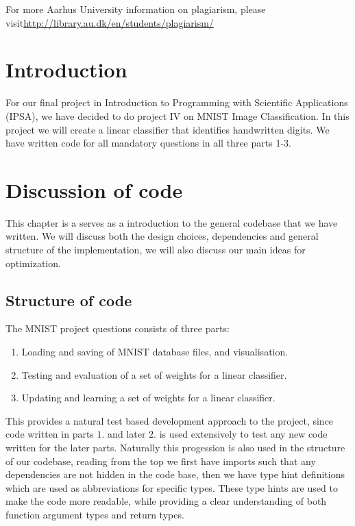 \documentclass[a4paper,oneside,article,english]{memoir}
\begin{document}
\begin{raggedleft}
For more Aarhus University information on plagiarism, please visit\newline \url{http://library.au.dk/en/students/plagiarism/}
\end{raggedleft}
\newpage



\chapter{Introduction}  
\label{ch:introduction}

For our final project in Introduction to Programming with Scientific
Applications (IPSA), we have decided to do project IV on MNIST Image
Classification. In this project we will create a linear classifier that
identifies handwritten digits. We have written code for all mandatory questions in all three
parts 1-3.



\chapter{Discussion of code}  
\label{ch:structure_of_code}
This chapter is a serves as a introduction to the general codebase that we have
written. We will discuss both the design choices, dependencies and general
structure of the implementation, we will also discuss our main ideas for optimization.

\section{Structure of code}  
\label{sec:structure_of_code}

The MNIST project questions consists of three parts:
\begin{enumerate}
  \item Loading and saving of MNIST database files, and visualisation.
  \item Testing and evaluation of a set of weights for a linear classifier.
  \item Updating and learning a set of weights for a linear classifier.
\end{enumerate}
This provides a natural test based development approach to the project, since
code written in parts $1.$ and later $2.$ is used extensively to test any new
code written for the later parts. Naturally this progession is also used in the
structure of our codebase, reading from the top we first have imports such that
any dependencies are not hidden in the code base, then we have type hint
definitions which are used as abbreviations for specific types. These type hints
are used to make the code more readable, while providing a clear understanding
of both function argument types and return types. 
\end{document}
